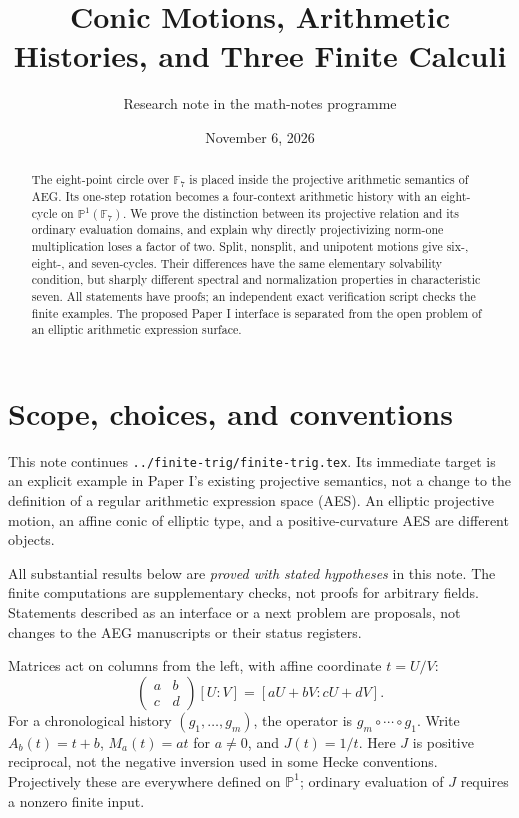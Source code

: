 \documentclass[11pt]{article}
\title{Conic Motions, Arithmetic Histories, and Three Finite Calculi}
\author{Research note in the math-notes programme}
\date{November 6, 2026}
\theoremstyle{definition}
\theoremstyle{remark}
\newcommand{\F}{\mathbb F}
\newcommand{\PP}{\mathbb P}
\begin{document}
\maketitle
\begin{abstract}
The eight-point circle over $\F_7$ is placed inside the projective arithmetic
semantics of AEG. Its one-step rotation becomes a four-context arithmetic
history with an eight-cycle on $\PP^1(\F_7)$. We prove the distinction between
its projective relation and its ordinary evaluation domains, and explain why
directly projectivizing norm-one multiplication loses a factor of two.
Split, nonsplit, and unipotent motions give six-, eight-, and seven-cycles.
Their differences have the same elementary solvability condition, but sharply
different spectral and normalization properties in characteristic seven.
All statements have proofs; an independent exact verification script checks
the finite examples. The proposed Paper I interface is separated from the
open problem of an elliptic arithmetic expression surface.
\end{abstract}
\tableofcontents

\section{Scope, choices, and conventions}
This note continues \texttt{../finite-trig/finite-trig.tex}. Its immediate
target is an explicit example in Paper I's existing projective semantics,
not a change to the definition of a regular arithmetic expression space
(AES). An elliptic projective motion, an affine conic of elliptic type, and
a positive-curvature AES are different objects.

All substantial results below are \emph{proved with stated hypotheses} in
this note. The finite computations are supplementary checks, not proofs for
arbitrary fields. Statements described as an interface or a next problem are
proposals, not changes to the AEG manuscripts or their status registers.

Matrices act on columns from the left, with affine coordinate $t=U/V$:
\[
 \begin{pmatrix}a&b\\c&d\end{pmatrix}[U:V]
   =[aU+bV:cU+dV].
\]
For a chronological history $(g_1,\ldots,g_m)$, the operator is
$g_m\circ\cdots\circ g_1$. Write
$A_b(t)=t+b$, $M_a(t)=at$ for $a\ne0$, and $J(t)=1/t$.
Here $J$ is positive reciprocal, not the negative inversion used in some
Hecke conventions. Projectively these are everywhere defined on $\PP^1$;
ordinary evaluation of $J$ requires a nonzero finite input.
\end{document}
